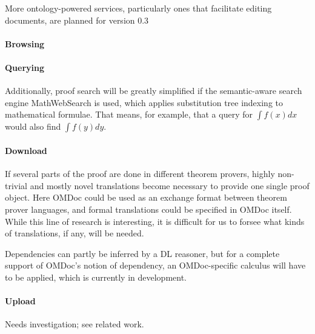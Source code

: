 More ontology-powered services, particularly ones that facilitate editing
documents, are planned for version 0.3\cite{swim-roadmap,Lange:SWiMSciColl07}

\paragraph{Browsing}


\paragraph{Querying} Additionally, proof search will be greatly simplified if
the semantic-aware search engine MathWebSearch\cite{KohSuc:asemf06} is used,
which applies substitution tree indexing to mathematical formulae.  That means,
for example, that a query for $\int f(x) dx$ would also find $\int f(y) dy$.

\paragraph{Download} If several parts of the proof are done in different
theorem provers, highly non-trivial and mostly novel translations become
necessary to provide one single proof object. Here OMDoc could be used as an
exchange format between theorem prover languages, and formal translations could
be specified in OMDoc itself.  While this line of research is interesting, it is
difficult for us to forsee what kinds of translations, if any, will be needed.

Dependencies can partly be inferred by a DL reasoner, but for a complete support
of OMDoc's notion of dependency, an OMDoc-specific calculus will have to be
applied, which is currently in development.

\paragraph{Upload} Needs investigation; see related work.


